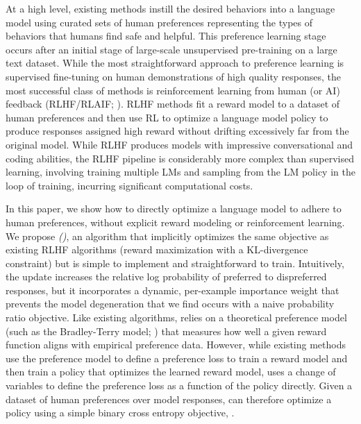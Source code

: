 At a high level, existing methods instill the desired behaviors into a language model using curated sets of human preferences representing the types of behaviors that humans find safe and helpful. This preference learning stage occurs after an initial stage of large-scale unsupervised pre-training on a large text dataset. While the most straightforward approach to preference learning is supervised fine-tuning on human demonstrations of high quality responses, the most successful class of methods is reinforcement learning from human (or AI) feedback (RLHF/RLAIF; \citep{christiano2017deep,bai2022constitutional}). RLHF methods fit a reward model to a dataset of human preferences and then use RL to optimize a language model policy to produce responses assigned high reward without drifting excessively far from the original model. While RLHF produces models with impressive conversational and coding abilities, the RLHF pipeline is considerably more complex than supervised learning, involving training multiple LMs and sampling from the LM policy in the loop of training, incurring significant computational costs.

In this paper, we show how to directly optimize a language model to adhere to human preferences, without explicit reward modeling or reinforcement learning.
We propose
\textit{{\methodfull} (\methodac)}, an algorithm that implicitly optimizes the same objective as existing RLHF algorithms (reward maximization with a KL-divergence constraint) but is simple to implement and straightforward to train. Intuitively, the {\methodac} update increases the relative log probability of preferred to dispreferred responses, but it incorporates a dynamic, per-example importance weight that prevents the model degeneration that we find occurs with a naive probability ratio objective. Like existing algorithms, {\methodac} relies on a theoretical preference model (such as the Bradley-Terry model; \cite{bradley1952rankanalysis}) that measures how well a given reward function aligns with empirical preference data. However, while existing methods use the preference model to define a preference loss to train a reward model and then train a policy that optimizes the learned reward model, {\methodac} uses a change of variables to define the preference loss as a function of the policy directly. Given a dataset of human preferences over model responses, {\methodac} can therefore optimize a policy using a simple binary cross entropy objective, .

